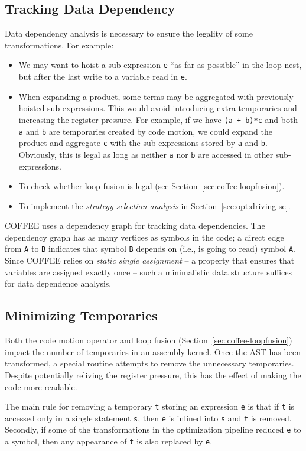 \subsection{Tracking Data Dependency}
Data dependency analysis is necessary to ensure the legality of some transformations. For example:
\begin{itemize}
\item We may want to hoist a sub-expression \texttt{e} ``as far as possible'' in the loop nest, but after the last write to a variable read in \texttt{e}.
\item When expanding a product, some terms may be aggregated with previously hoisted sub-expressions. This would avoid introducing extra temporaries and increasing the register pressure. For example, if we have \texttt{(a + b)*c} and both \texttt{a} and \texttt{b} are temporaries created by code motion, we could expand the product and aggregate \texttt{c} with the sub-expressions stored by \texttt{a} and \texttt{b}. Obviously, this is legal as long as neither \texttt{a} nor \texttt{b} are accessed in other sub-expressions.
\item To check whether loop fusion is legal (see Section~\ref{sec:coffee-loopfusion}).
\item To implement the {\em strategy selection analysis} in Section~\ref{sec:opt:driving-se}.
\end{itemize}

COFFEE uses a dependency graph for tracking data dependencies. The dependency graph has as many vertices as symbols in the code; a direct edge from \texttt{A} to \texttt{B} indicates that symbol \texttt{B} depends on (i.e., is going to read) symbol \texttt{A}. Since COFFEE relies on \textit{static single assignment} -- a property that ensures that variables are assigned exactly once -- such a minimalistic data structure suffices for data dependence analysis.

\subsection{Minimizing Temporaries}
Both the code motion operator and loop fusion (Section~\ref{sec:coffee-loopfusion}) impact the number of temporaries in an assembly kernel. Once the AST has been transformed, a special routine attempts to remove the unnecessary temporaries. Despite potentially reliving the register pressure, this has the effect of making the code more readable.

The main rule for removing a temporary \texttt{t} storing an expression \texttt{e} is that if \texttt{t} is accessed only in a single statement \texttt{s}, then \texttt{e} is inlined into \texttt{s} and \texttt{t} is removed. Secondly, if some of the transformations in the optimization pipeline reduced \texttt{e} to a symbol, then any appearance of \texttt{t} is also replaced by \texttt{e}.


